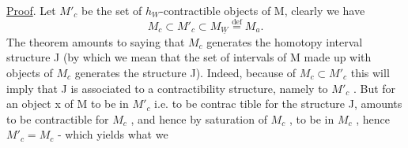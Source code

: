 \uline{Proof}. Let $M'_c$ be the set of $h_W$-contractible objects of M, clearly we have
\[ M_c \subset M'_c \subset M_{\underline{W}} \overset{\mathrm{def}}{=} M_a . \]
The theorem amounts to saying that $M_c$ generates the homotopy interval
structure J (by which we mean that the set of intervals of M made up with
objects of $M_c$ generates the structure J). Indeed, because of $M_c \subset M'_c$
this will imply that J is associated to a contractibility structure, 
 namely to $M'_c$ . But for an object x of M to be in $M'_c$ i.e. to be contrac
tible for the structure J, amounts to be contractible for $M_c$ , and hence
by saturation of $M_c$ , to be in $M_c$ , hence $M'_c = M_c$ - which yields what we

